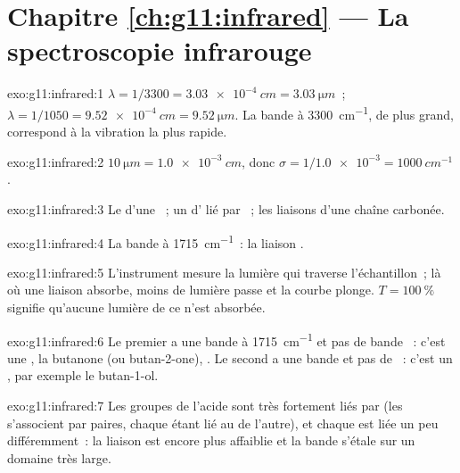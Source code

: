 \section*{Chapitre \ref{ch:g11:infrared} --- La spectroscopie infrarouge}

\begin{solution}{exo:g11:infrared:1}
$\lambda = 1/3300 = \qty{3.03e-4}{cm} = \qty{3.03}{\micro m}$~;
$\lambda = 1/1050 = \qty{9.52e-4}{cm} = \qty{9.52}{\micro m}$. La bande à
\qty{3300}{cm^{-1}}, de  plus grand, correspond à la
vibration la plus rapide.
\end{solution}

\begin{solution}{exo:g11:infrared:2}
$\qty{10}{\micro m} = \qty{1.0e-3}{cm}$, donc $\sigma = 1/\num{1.0e-3} =
\qty{1000}{cm^{-1}}$.
\end{solution}

\begin{solution}{exo:g11:infrared:3}
Le  d'une ~; un  d' lié par ~; les liaisons  d'une chaîne carbonée.
\end{solution}

\begin{solution}{exo:g11:infrared:4}
La bande à \qty{1715}{cm^{-1}}~: la liaison .
\end{solution}

\begin{solution}{exo:g11:infrared:5}
L'instrument mesure la lumière qui traverse l'échantillon~; là où une
liaison absorbe, moins de lumière passe et la courbe plonge. $T =
\qty{100}{\percent}$ signifie qu'aucune lumière de ce  n'est
absorbée.
\end{solution}

\begin{solution}{exo:g11:infrared:6}
Le premier a une bande  à \qty{1715}{cm^{-1}} et pas de bande
~: c'est une , la butanone (ou butan-2-one),
. Le second a une bande  et pas de
~: c'est un , par exemple le butan-1-ol.
\end{solution}

\begin{solution}{exo:g11:infrared:7}
Les groupes  de l'acide sont très fortement liés par  (les  s'associent par paires, chaque  étant
lié au  de l'autre), et chaque  est liée un peu
différemment~: la liaison est encore plus affaiblie et la bande s'étale
sur un domaine très large.
\end{solution}


